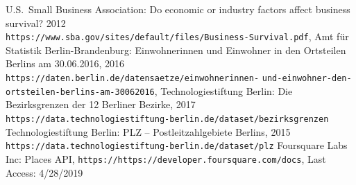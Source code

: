 \documentclass[letter]{scrartcl}
\begin{document}
\begin{thebibliography}{9}
U.S.~Small Business Association: Do economic or industry factors affect business survival? 2012 \\
\texttt{https://www.sba.gov/sites/default/files/Business-Survival.pdf}, 
Amt für Statistik Berlin-Brandenburg: Einwohnerinnen und Einwohner in den Ortsteilen Berlins am 30.06.2016, 2016 \\
\texttt{https://daten.berlin.de/datensaetze/einwohnerinnen-}
\texttt{und-einwohner-den-ortsteilen-berlins-am-30062016},   
 Technologiestiftung Berlin: Die Bezirksgrenzen der 12 Berliner Bezirke, 2017\\
 \texttt{https://data.technologiestiftung-berlin.de/dataset/bezirksgrenzen}  
 Technologiestiftung Berlin: PLZ -- Postleitzahlgebiete Berlins, 2015\\
 \texttt{https://data.technologiestiftung-berlin.de/dataset/plz}
 Foursquare Labs Inc: Places API, \texttt{https://https://developer.foursquare.com/docs}, Last Access: 4/28/2019
\end{thebibliography}
\end{document}
